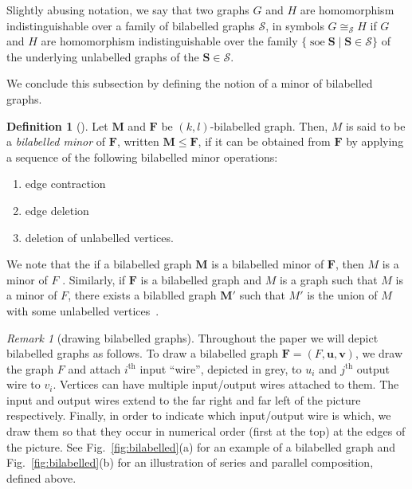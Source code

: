 \documentclass[11pt,a4paper]{article}
\theoremstyle{plain}
\theoremstyle{remark}
\newtheorem{note}{Remark}[thm]
\theoremstyle{definition}
\newtheorem{definition}[thm]{Definition}
\DeclareMathOperator{\soe}{soe}
\begin{document}
Slightly abusing notation, we say that two graphs $G$ and $H$ are homomorphism indistinguishable over a family of bilabelled graphs $\mathcal{S}$, in symbols $G \cong_{\mathcal{S}} H$ if $G$ and $H$ are homomorphism indistinguishable over the family $\{\soe \boldsymbol{S} \mid \boldsymbol{S} \in \mathcal{S}\}$ of the underlying unlabelled graphs of the $\boldsymbol{S} \in \mathcal{S}$.

We conclude this subsection by defining the notion of a minor of bilabelled graphs.

\begin{definition}[\cite{roberson-seppelt-arxiv}]
  Let $\boldsymbol{M}$ and $\boldsymbol{F}$ be $(k,l)$-bilabelled graph. Then, $M$ is said to be a \emph{bilabelled minor} of $\boldsymbol{F}$, written $\boldsymbol{M} \leq \boldsymbol{F}$, if it can be obtained from $\boldsymbol{F}$ by applying a sequence of the following bilabelled minor operations: 
    \begin{enumerate}
        \item edge contraction
        \item edge deletion
        \item deletion of unlabelled vertices.
    \end{enumerate}
\end{definition}

We note that the if a bilabelled graph $\boldsymbol{M}$ is a bilabelled minor of $\boldsymbol{F}$, then $M$ is a minor of $F$ \cite[Lemma 4.12]{roberson-seppelt-arxiv}. Similarly, if $\boldsymbol{F}$ is a bilabelled graph and $M$ is a graph such that $M$ is a minor of $F$, there exists a bilablled graph $\boldsymbol{M'}$ such that $M'$ is the union of $M$ with some unlabelled vertices~\cite[Lemma 4.13]{roberson-seppelt-arxiv}.



\begin{note}[drawing bilabelled graphs]
  Throughout the paper we will depict bilabelled graphs as follows.
  To draw a bilabelled graph $\boldsymbol{F} = (F, \boldsymbol{u}, \boldsymbol{v})$, we draw the graph $F$ and attach $i^{\text{th}}$ input ``wire'', depicted in grey, to $u_i$ and $j^{\text{th}}$ output wire to $v_i$.
  Vertices can have multiple input/output wires attached to them.
  The input and output wires extend to the far right and far left of the picture respectively. 
  Finally, in order to indicate which input/output wire is which, we draw them so that they occur in numerical order (first at the top) at the edges of the picture.
  See Fig.~\ref{fig:bilabelled}(a) for an example of a bilabelled graph and Fig.~\ref{fig:bilabelled}(b) for an illustration of series and parallel composition, defined above.
\end{note}
\end{document}
